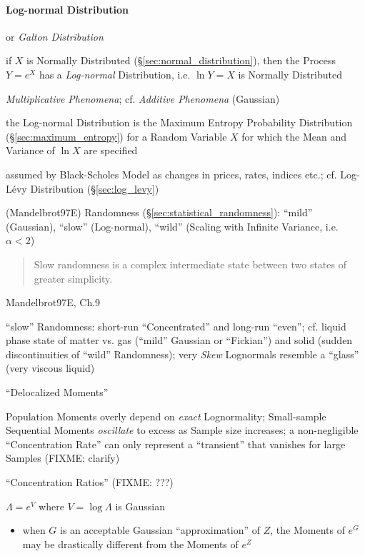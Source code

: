 \paragraph{Log-normal Distribution}\label{sec:lognormal_distribution}\hfill

or \emph{Galton Distribution}

if $X$ is Normally Distributed (\S\ref{sec:normal_distribution}), then the
Process $Y = e^X$ has a \emph{Log-normal} Distribution, i.e. $\ln Y = X$ is
Normally Distributed

\emph{Multiplicative Phenomena}; cf. \emph{Additive Phenomena} (Gaussian)

the Log-normal Distribution is the Maximum Entropy Probability Distribution
(\S\ref{sec:maximum_entropy}) for a Random Variable $X$ for which the Mean and
Variance of $\ln X$ are specified

assumed by Black-Scholes Model as changes in prices, rates, indices etc.; cf.
Log-L\'evy Distribution (\S\ref{sec:log_levy})

(Mandelbrot97E) Randomness (\S\ref{sec:statistical_randomness}): ``mild''
(Gaussian), ``slow'' (Log-normal), ``wild'' (Scaling with Infinite Variance,
i.e. $\alpha < 2$)

\begin{quote}
  Slow randomness is a complex intermediate state between two states of greater
  simplicity.
\end{quote}

Mandelbrot97E, Ch.9

``slow'' Randomness: short-run ``Concentrated'' and long-run ``even''; cf.
liquid phase state of matter vs. gas (``mild'' Gaussian or ``Fickian'') and
solid (sudden discontinuities of ``wild'' Randomness);
very \emph{Skew} Lognormals resemble a ``glass'' (very viscous liquid)

``Delocalized Moments''

Population Moments overly depend on \emph{exact} Lognormality; Small-sample
Sequential Moments \emph{oscillate} to excess as Sample size increases; a
non-negligible ``Concentration Rate'' can only represent a ``transient'' that
vanishes for large Samples (FIXME: clarify)

``Concentration Ratios'' (FIXME: ???)

$\Lambda = e^V$ where $V = \log \Lambda$ is Gaussian

\begin{itemize}
  \item when $G$ is an acceptable Gaussian ``approximation'' of $Z$, the Moments
    of $e^G$ may be drastically different from the Moments of $e^Z$
\end{itemize}

